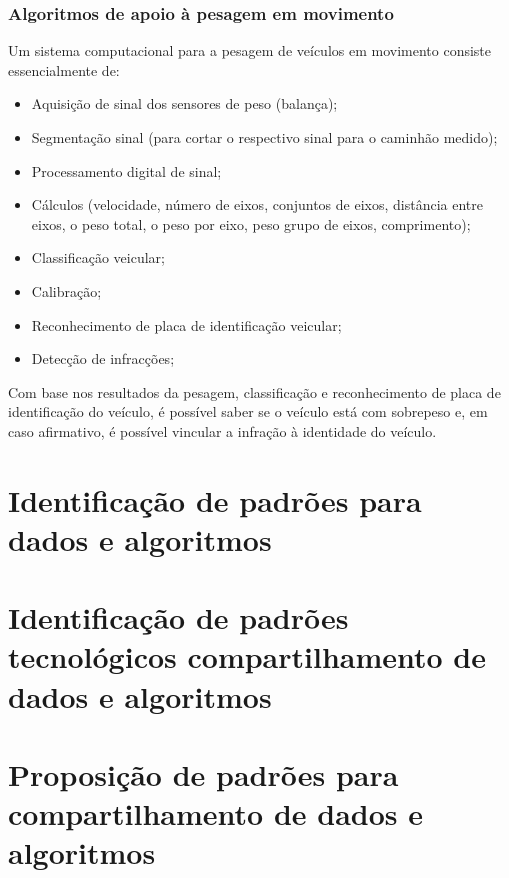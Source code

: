 \documentclass{ufscThesis}
\begin{document}

\subsection{Algoritmos de apoio à pesagem em movimento}\label{algoritmos}
Um sistema computacional para a pesagem de veículos em movimento consiste essencialmente de:

\begin{itemize}
\item Aquisição de sinal dos sensores de peso (balança);
\item Segmentação sinal (para cortar o respectivo sinal para o caminhão medido);
\item Processamento digital de sinal;
\item Cálculos (velocidade, número de eixos, conjuntos de eixos, distância entre eixos, o peso total, o peso por eixo, peso grupo de eixos, comprimento);
\item Classificação veicular;
\item Calibração;
\item Reconhecimento de placa de identificação veicular;
\item Detecção de infracções;
\end{itemize}

Com base nos resultados da pesagem, classificação e reconhecimento de placa de identificação do veículo, é possível saber se o veículo está com sobrepeso e, em caso afirmativo, é possível vincular a infração à identidade do veículo.


\chapter{Identificação de padrões para dados e algoritmos}\label{id-standards}


\chapter{Identificação de padrões tecnológicos compartilhamento de dados e algoritmos}\label{id-tech-standards}


\chapter{Proposição de padrões para compartilhamento de dados e algoritmos}\label{standards-proposition}
\end{document}
